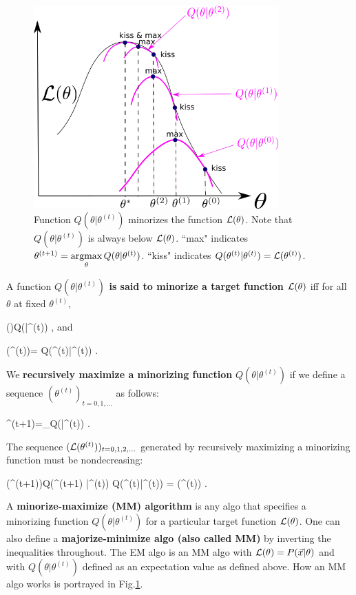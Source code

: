 \begin{figure}[h!]
\centering
\includegraphics[width=3.7in]
{emax/minorize.png}
\caption{Function $Q(\theta|\theta^{(t)})$
minorizes the function ${\cal L}(\theta)$.
Note that $Q(\theta|\theta^{(t)})$
is always below
 ${\cal L}(\theta)$.
``max" indicates 
$\theta^{(t+1)}=
\mathop{\mathrm{argmax}}\limits_\theta Q(\theta|\theta^{(t)})$.
``kiss" indicates
 $Q(\theta^{(t)}|\theta^{(t)})=
{\cal L}(\theta^{(t)})$. 
}
\label{fig-minorize}
\end{figure}



A function {\bf $Q(\theta|\theta^{(t)})$ 
is said to minorize 
 a target
 function ${\cal L}(\theta)$}
iff for all $ \theta$ at fixed $\theta^{(t)}$,


\beq
\call(\theta)\geq Q(\theta|\theta^{(t)})
\;,
\eeq
and

\beq
\call(\theta^{(t)})=
 Q(\theta^{(t)}|\theta^{(t)})
\;.
\eeq

We  {\bf recursively maximize a minorizing function} $Q(\theta|\theta^{(t)})$
if we define a sequence $(\theta^{(t)})_{t=0, 1, \ldots}$
as follows:

\beq
\theta^{(t+1)}=\argmax_\theta Q(\theta|\theta^{(t)})
\;.
\eeq

The sequence 
$({\cal L}(\theta^{(t)}))_{t=0, 1, 2, \ldots}$
generated by 
recursively maximizing a minorizing function
must be nondecreasing:

\beq
\call(\theta^{(t+1)})\geq Q(\theta^{(t+1)}
|\theta^{(t)})\geq
 Q(\theta^{(t)}|\theta^{(t)}) 
= \call(\theta^{(t)})
\;.
\eeq

A {\bf
minorize-maximize (MM) algorithm}
is any algo that
specifies a
minorizing function $Q(\theta|\theta^{(t)})$
for a particular target
 function ${\cal L}(\theta)$.
One can also define a 
{\bf majorize-minimize algo (also
called  MM)}
by inverting the inequalities throughout.
The EM algo is an MM algo
with ${\cal L}(\theta)=P({\vec{x}}|\theta)$
and with $Q(\theta|\theta^{(t)})$
defined as an expectation value as defined 
above.
How an MM algo works 
is portrayed in Fig.\ref{fig-minorize}.




